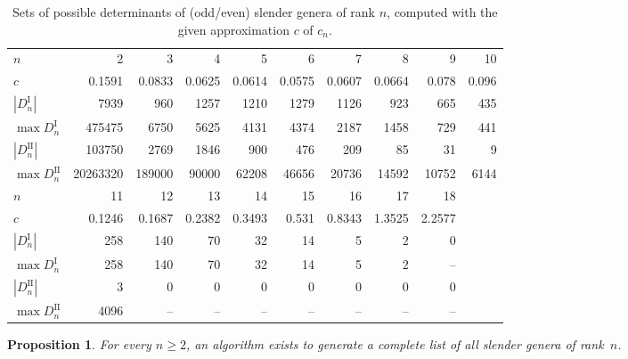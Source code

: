 \documentclass[a4paper]{amsart}
\theoremstyle{definition}
\theoremstyle{plain}
\newtheorem{proposition}[definition]{Proposition}
\newcommand{\I}{\mathrm{I}}
\newcommand{\II}{\mathrm{II}}
\begin{document}
\begin{table}
\footnotesize
\caption{Sets of possible determinants of (odd/even) slender genera of rank \(n\), computed with the given approximation \(c\) of \(c_n\). }%
\label{tab:possible.determinants}
\begin{tabular}{lrrrrrrrrr}
    \toprule
    \(n\)                 & 2 & 3      & 4      & 5      & 6      & 7      & 8      & 9     & 10    \\
    \(c\) &    0.1591      & 0.0833 & 0.0625 & 0.0614 & 0.0575 & 0.0607 & 0.0664 & 0.078 & 0.096 \\
    \midrule
    \(|D_n^\I|\) & 7939    & 960    & 1257   & 1210   & 1279   & 1126   & 923    & 665   & 435   \\
    \(\max D_n^\I\) & 475475 & 6750   & 5625   & 4131   & 4374   & 2187   & 1458  & 729   & 441   \\
    \(|D_n^\II|\) & 103750   & 2769   & 1846   & 900    & 476    & 209    & 85     & 31    & 9     \\
    \(\max D_n^\II\)&20263320  & 189000 & 90000  & 62208  & 46656  & 20736  & 14592  & 10752 & 6144  \\
    \midrule
    \(n\)                 & 11     & 12     & 13     & 14     & 15    & 16     & 17     & 18     \\
    \(c\)          & 0.1246 & 0.1687 & 0.2382 & 0.3493 & 0.531 & 0.8343 & 1.3525 & 2.2577 \\
    \midrule
    \(|D_n^\I|\)     & 258    & 140    & 70     & 32     & 14    & 5      & 2      & 0      \\
    \(\max D_n^\I\)  & 258    & 140    & 70     & 32     & 14    & 5      & 2      & --     \\
    \(|D_n^\II|\)    & 3      & 0      & 0      & 0      & 0     & 0      & 0      & 0      \\
    \(\max D_n^\II\) & 4096   & --     & --     & --     & --    & --     & --     & --     \\
    \bottomrule
\end{tabular}
\end{table} 

\begin{proposition} \label{prop:algorithm.slender}
    For every \(n \geq 2\), an algorithm exists to generate a complete list of all slender genera of rank~\(n\).
\end{proposition}
\end{document}
